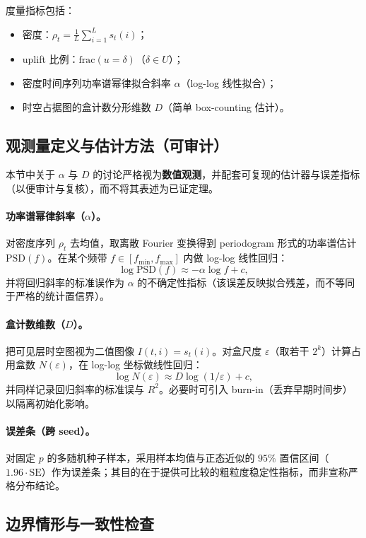 度量指标包括：
\begin{itemize}
  \item 密度：$\rho_t=\frac{1}{L}\sum_{i=1}^L s_t(i)$；
  \item uplift 比例：$\mathrm{frac}(u=\delta)$（$\delta\in U$）；
  \item 密度时间序列功率谱幂律拟合斜率 $\alpha$（log-log 线性拟合）；
  \item 时空占据图的盒计数分形维数 $D$（简单 box-counting 估计）。
\end{itemize}

\subsection{观测量定义与估计方法（可审计）}

本节中关于 $\alpha$ 与 $D$ 的讨论严格视为\textbf{数值观测}，并配套可复现的估计器与误差指标（以便审计与复核），而不将其表述为已证定理。

\paragraph{功率谱幂律斜率（$\alpha$）。}
对密度序列 $\rho_t$ 去均值，取离散 Fourier 变换得到 periodogram 形式的功率谱估计 $\mathrm{PSD}(f)$。在某个频带 $f\in[f_{\min},f_{\max}]$ 内做 log-log 线性回归：
$$
\log \mathrm{PSD}(f)\approx -\alpha\log f + c,
$$
并将回归斜率的标准误作为 $\alpha$ 的不确定性指标（该误差反映拟合残差，而不等同于严格的统计置信界）。

\paragraph{盒计数维数（$D$）。}
把可见层时空图视为二值图像 $I(t,i)=s_t(i)$。对盒尺度 $\varepsilon$（取若干 $2^k$）计算占用盒数 $N(\varepsilon)$，在 log-log 坐标做线性回归：
$$
\log N(\varepsilon)\approx D\log(1/\varepsilon)+c,
$$
并同样记录回归斜率的标准误与 $R^2$。必要时可引入 burn-in（丢弃早期时间步）以隔离初始化影响。

\paragraph{误差条（跨 seed）。}
对固定 $p$ 的多随机种子样本，采用样本均值与正态近似的 $95\%$ 置信区间（$1.96\cdot \mathrm{SE}$）作为误差条；其目的在于提供可比较的粗粒度稳定性指标，而非宣称严格分布结论。

\subsection{边界情形与一致性检查}

